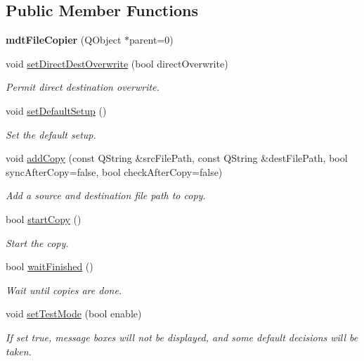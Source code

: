 \subsection*{Public Member Functions}
\begin{DoxyCompactItemize}
\item 
\hypertarget{classmdt_file_copier_a32fc7a1c4d796ce0f3781c24257a0a02}{
{\bfseries mdtFileCopier} (QObject $\ast$parent=0)}
\label{classmdt_file_copier_a32fc7a1c4d796ce0f3781c24257a0a02}

\item 
void \hyperlink{classmdt_file_copier_ad045db0c7b84a7c9505d7ac1704f7413}{setDirectDestOverwrite} (bool directOverwrite)
\begin{DoxyCompactList}\small\item\em Permit direct destination overwrite. \end{DoxyCompactList}\item 
void \hyperlink{classmdt_file_copier_a868ce61ec7d8f590002dd350276413a4}{setDefaultSetup} ()
\begin{DoxyCompactList}\small\item\em Set the default setup. \end{DoxyCompactList}\item 
void \hyperlink{classmdt_file_copier_ad0730aae81b3ba64eec4563390b852a3}{addCopy} (const QString \&srcFilePath, const QString \&destFilePath, bool syncAfterCopy=false, bool checkAfterCopy=false)
\begin{DoxyCompactList}\small\item\em Add a source and destination file path to copy. \end{DoxyCompactList}\item 
bool \hyperlink{classmdt_file_copier_acd5397fbea57f8169a5dddd2809d26cb}{startCopy} ()
\begin{DoxyCompactList}\small\item\em Start the copy. \end{DoxyCompactList}\item 
bool \hyperlink{classmdt_file_copier_adcfa582fe6e1e3420c8285c2301323f6}{waitFinished} ()
\begin{DoxyCompactList}\small\item\em Wait until copies are done. \end{DoxyCompactList}\item 
void \hyperlink{classmdt_file_copier_ad971d6b727c4ceaa1a39bf356d694654}{setTestMode} (bool enable)
\begin{DoxyCompactList}\small\item\em If set true, message boxes will not be displayed, and some default decisions will be taken. \end{DoxyCompactList}\end{DoxyCompactItemize}


